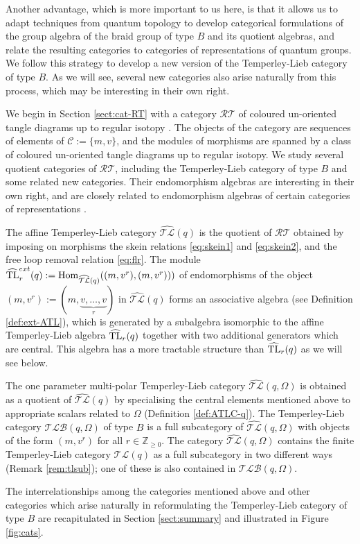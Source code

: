 \documentclass[12pt]{amsart}
\theoremstyle{definition}
\theoremstyle{remark}
\numberwithin{equation}{section}
\newcommand{\mc}{\mathcal}
\newcommand{\Z}{{\mathbb Z}}
\newcommand{\cC}{\mc C}
\newcommand{\Hom}{{\rm{Hom}}}
\newcommand{\tl}{Temperley-Lieb }
\newcommand{\HTL}{\widehat{\rm TL}}
\newcommand{\ATLC}{{\widehat{\mathcal{TL}}}}
\newcommand{\TLC}{\mathcal{TL}}
\newcommand{\TLBC}{\mathcal{TLB}}
\newcommand{\RTC}{\mathcal{RT}}
\begin{document}
Another advantage, which is more important to us here, is that it allows us to adapt techniques from quantum topology \cite{T} to 
develop categorical formulations of the group algebra of the braid group of type $B$ and its quotient algebras, and relate
 the resulting categories to categories of representations of quantum groups. We follow 
this strategy to develop a new version of the \tl category of type $B$. As we will see, several new categories also arise 
naturally from this process,  which may be interesting in their own right. 

We begin in Section \ref{sect:cat-RT} with a category $\RTC$ of coloured un-oriented tangle diagrams up to regular isotopy
 \cite{FY, RT, T}. The objects of the category are sequences of elements of $\cC:=\{m, v\}$, and the modules of morphisms are spanned
  by a class of coloured un-oriented tangle diagrams up to regular isotopy.  We study several quotient categories of $\RTC$, including
  the \tl category of type $B$  and some related new categories. Their endomorphism algebras are interesting in their own right, and are closely
related to endomorphism algebras of certain categories of representations \cite{ALZ, Ro, Ze}. 

The affine \tl category $\ATLC(q)$ is the quotient of $\RTC$ obtained by imposing on morphisms the skein relations \eqref{eq:skein1} 
and \eqref{eq:skein2}, and the free loop removal relation \eqref{eq:flr}.
The module $\HTL^{ext}_r(q):=\Hom_{\ATLC(q)}((m, v^r), (m, v^r)))$ of endomorphisms of the object 
$(m, v^r):=(m, \underbrace{v, \dots, v}_r)$ in $\ATLC(q)$  forms an associative algebra (see Definition \ref{def:ext-ATL}), 
which is generated by a subalgebra isomorphic to the affine \tl algebra $\HTL_r(q)$ together with two additional generators which are central. 
 This algebra has a more tractable structure than $\HTL_r(q)$ as we will see below. 

The one parameter multi-polar \tl category $\ATLC(q, \Omega)$ is obtained as a quotient of $\ATLC(q)$ by specialising 
the central elements mentioned above to appropriate scalars related to $\Omega$ (Definition \ref{def:ATLC-q}). 
 The  \tl category $\TLBC(q, \Omega)$ of type $B$ is a full subcategory of $\ATLC(q, \Omega)$ with objects of the 
 form $(m, v^r)$ for all $r\in\Z_{\ge 0}$. The category $\ATLC(q, \Omega)$ contains the finite \tl category $\TLC(q)$ as a 
 full subcategory in two different ways (Remark \ref{rem:tlsub}); one of these
 is also contained in $\TLBC(q, \Omega)$. 

The interrelationships among the categories mentioned above and other categories which arise naturally in reformulating the  \tl 
category of type $B$ are recapitulated in Section \ref{sect:summary} and illustrated in Figure \ref{fig:cats}.
\end{document}
